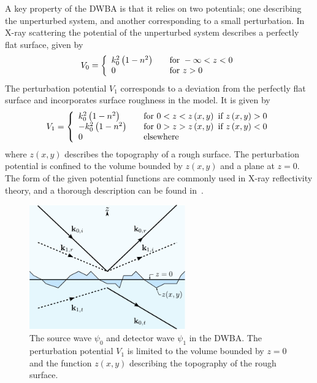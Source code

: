 \documentclass[10pt,twoside, b5paper,pdftex]{report}
\begin{document}
A key property of the DWBA is that it relies on two potentials; one describing the unperturbed system, and another corresponding to a small perturbation. In X-ray scattering the potential of the unperturbed system describes a perfectly flat surface, given by 
\begin{equation}\label{eq:U0}
V_{0} = \left\{
  \begin{array}{l l}
    k_{0}^{2}\left(1-n^{2}\right) & \quad \mbox{for } -\infty < z < 0\\
    0 & \quad \mbox{for } z > 0\\
  \end{array} \right.
\end{equation}
The perturbation potential $V_1$ corresponds to a deviation from the perfectly flat surface and incorporates surface roughness in the model. It is given by 
\begin{equation}\label{eq:U1}
V_{1} = \left\{
  \begin{array}{l l}
    k_{0}^{2}\left(1-n^{2}\right) & \quad \mbox{for } 0 < z < z\left(x,y\right) \mbox{ if } z\left(x,y\right) > 0\\
    -k_{0}^{2}\left(1-n^{2}\right) & \quad \mbox{for } 0 > z > z\left(x,y\right) \mbox{ if } z\left(x,y\right) < 0\\
    0 & \quad \mbox{elsewhere}\\
  \end{array} \right.
\end{equation}
where $z(x,y)$ describes the topography of a rough surface. The perturbation potential is confined to the volume bounded by $z(x,y)$ and a plane at $z = 0$.  The form of the given potential functions are commonly used in X-ray reflectivity theory, and a thorough description can be found in~\cite{GIBAUD}. 
%
\begin{figure}[htbp]
	\begin{center}
		\includegraphics[width=0.6\textwidth]{figures/srcdet.pdf}		
	\end{center}
	\caption{The source wave $\psi_0$ and detector wave $\psi_1$ in the DWBA. The perturbation potential $V_1$ is limited to the volume bounded by $z = 0$ and the function $z(x,y)$  describing the topography of the rough surface. \label{fig:srcdet}}
\end{figure}
\end{document}
